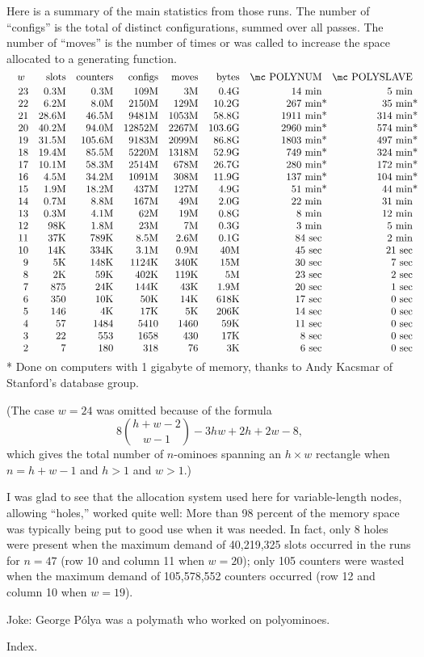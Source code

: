 Here is a summary of the main statistics from those runs. The number of
``configs'' is the total of distinct configurations, summed over all passes.
The number of ``moves'' is the number of times  or  was
called to increase the space allocated to a generating function.
$$\vbox{\halign{&\quad\hfil#\cr
$w\ $&slots&counters&configs&moves&bytes&\mc POLYNUM&\mc POLYSLAVE\cr
\noalign{\vskip2pt}
23&    0.3M&    0.3M&   109M&   3M&  0.4G&     14 min&        5 min\cr
22&    6.2M&    8.0M&  2150M& 129M& 10.2G&    267 min\rlap*& 35 min\rlap*\cr
21&   28.6M&   46.5M&  9481M&1053M& 58.8G&   1911 min\rlap*&314 min\rlap*\cr
20&   40.2M&   94.0M& 12852M&2267M&103.6G&   2960 min\rlap*&574 min\rlap*\cr
19&   31.5M&  105.6M&  9183M&2099M& 86.8G&   1803 min\rlap*&497 min\rlap*\cr
18&   19.4M&   85.5M&  5220M&1318M& 52.9G&    749 min\rlap*&324 min\rlap*\cr
17&   10.1M&   58.3M&  2514M& 678M& 26.7G&    280 min\rlap*&172 min\rlap*\cr
16&    4.5M&   34.2M&  1091M& 308M& 11.9G&    137 min\rlap*&104 min\rlap*\cr
15&    1.9M&   18.2M&   437M& 127M&  4.9G&     51 min\rlap*& 44 min\rlap*\cr
14&    0.7M&    8.8M&   167M&  49M&  2.0G&     22 min&       31 min\cr
13&    0.3M&    4.1M&    62M&  19M&  0.8G&      8 min&       12 min\cr
12&     98K&    1.8M&    23M&   7M&  0.3G&      3 min&        5 min\cr
11&     37K&    789K&   8.5M& 2.6M&  0.1G&     84 sec&        2 min\cr
10&     14K&    334K&   3.1M& 0.9M&   40M&     45 sec&       21 sec\cr
9&      5K&    148K&  1124K& 340K&   15M&     30 sec&        7 sec\cr
8&      2K&     59K&   402K& 119K&    5M&     23 sec&        2 sec\cr
7&     875&     24K&   144K&  43K&  1.9M&     20 sec&        1 sec\cr
6&     350&     10K&    50K&  14K&  618K&     17 sec&        0 sec\cr
5&     146&      4K&    17K&   5K&  206K&     14 sec&        0 sec\cr
4&      57&    1484&   5410& 1460&   59K&     11 sec&        0 sec\cr
3&      22&     553&   1658&  430&   17K&      8 sec&        0 sec\cr
2&       7&     180&    318&   76&    3K&      6 sec&        0 sec\cr
}}$$
* Done on computers with 1 gigabyte of memory, thanks to
Andy Kacsmar of Stanford's database group.

\smallskip\noindent (The case $w=24$ was omitted because of the formula
$$
8{h+w-2\choose w-1}-3hw+2h+2w-8,
$$
which gives the total number of $n$-ominoes spanning an $h\times w$
rectangle when $n=h+w-1$ and $h>1$ and $w>1$.)

\fi

I was glad to see that the allocation system used here
for variable-length
nodes, allowing ``holes,'' worked quite well: More than 98 percent of
the memory space was typically being put to good use when it was needed.
In fact, only 8 holes were present when the maximum demand of 40,219,325
slots occurred in the runs for $n=47$ (row 10 and column 11
when $w=20$); only 105 counters were wasted when the maximum demand of
105,578,552 counters occurred (row 12 and column 10 when $w=19$).

\fi

Joke: George P\'olya was a polymath who worked on
polyominoes.

\fi

Index.
\fi

\inx
\fin
\con
